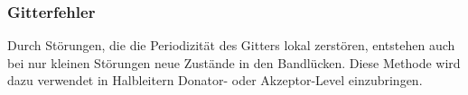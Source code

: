 \subsubsection{Gitterfehler}
Durch Störungen, die die Periodizität des Gitters lokal zerstören, entstehen auch bei nur kleinen Störungen neue Zustände in den Bandlücken. Diese Methode wird dazu verwendet in Halbleitern Donator- oder Akzeptor-Level einzubringen.
